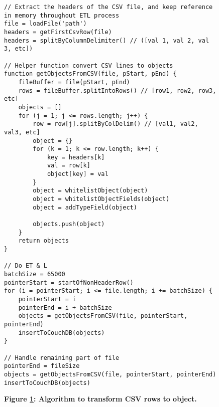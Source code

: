 
\begin{figure}[H]
    \centering
    \begin{mdframed}
        \centering
        \begin{verbatim}
// Extract the headers of the CSV file, and keep reference in memory throughout ETL process
file = loadFile('path')
headers = getFirstCsvRow(file)
headers = splitByColumnDelimiter() // ([val 1, val 2, val 3, etc])

// Helper function convert CSV lines to objects
function getObjectsFromCSV(file, pStart, pEnd) {
    fileBuffer = file(pStart, pEnd)
    rows = fileBuffer.splitIntoRows() // [row1, row2, row3, etc]
    objects = []
    for (j = 1; j <= rows.length; j++) {
        row = row[j].splitByColDelim() // [val1, val2, val3, etc]
        object = {}
        for (k = 1; k <= row.length; k++) {
            key = headers[k]
            val = row[k]
            object[key] = val
        }
        object = whitelistObject(object)
        object = whitelistObjectFields(object)
        object = addTypeField(object)

        objects.push(object)
    }
    return objects
}

// Do ET & L
batchSize = 65000
pointerStart = startOfNonHeaderRow()
for (i = pointerStart; i <= file.length; i += batchSize) {
    pointerStart = i
    pointerEnd = i + batchSize
    objects = getObjectsFromCSV(file, pointerStart, pointerEnd)
    insertToCouchDB(objects)
}

// Handle remaining part of file
pointerEnd = fileSize
objects = getObjectsFromCSV(file, pointerStart, pointerEnd)
insertToCouchDB(objects)
        \end{verbatim}
    \end{mdframed}
    \caption[Row to object transformation]{\textbf{Figure \ref{row-object-transformation}: Algorithm to transform CSV rows to object.}}
    \label{row-object-transformation}
\end{figure}